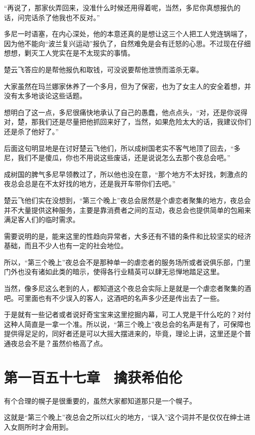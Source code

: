 “再说了，那家伙弄回来，没准什么时候还用得着呢，当然，多尼你真想报仇的话，问完话杀了他我也不反对。”

多尼一时语塞，在内心深处，他的本意还真的是想让这三个人把工人党连锅端了，因为他不能向“波兰复兴运动”报仇了，自然难免是会有迁怒的心思。不过现在仔细想想，剿灭工人党实在是不太现实的事情。

楚云飞答应的是帮他报仇和取钱，可没说要帮他泄愤而滥杀无辜。

大家虽然在玛兰娜家休养了一个多月，但为了保密，也为了女主人的安全着想，并没有太多地谈论这些话题。

想明白了这一点，多尼很痛快地承认了自己的愚蠢，他点点头，“对，还是你说得对，楚，那我们还是尽量把他抓回来好了，当然，如果危险太大的话，我建议你们还是杀了他好了。”

后面这句明显地是在讨好楚云飞他们，所以成树国老实不客气地顶了回去，“多尼，我们不是傻瓜，你也不用说这些废话，还是说说怎么去那个夜总会吧。”

成树国的脾气多尼早领教过了，所以他也没在意，“那个地方不太好找，刺激点的夜总会总是在不太好找的地方，还是我开车带你们去吧。”

楚云飞他们实在没想到，“第三个晚上”夜总会居然是个虐恋者聚集的地方，夜总会并不大量提供这种服务，主要是靠消费者之间的互动，夜总会也提供简单的包厢来满足客人们的临时需求。

需要说明的是，能来这里的性趋向异常者，大多还有不错的条件和比较坚实的经济基础，而且不少人也有一定的社会地位。

所以，“第三个晚上”夜总会不是那种单一的虐恋者的服务场所或者说俱乐部，门里门外也没有诸如此类的暗示，使得各行业精英可以肆无忌惮地踏足这里。

当然，像多尼这么老到的人，都知道这个夜总会实际上是就是一个虐恋者聚集的酒吧。可里面也有不少误入的客人，这酒吧的名声多少还是传出去了一些。

于是就有一些记者或者说好奇宝宝来这里挖掘内幕，可工人党是干什么吃的？对付这种人简直是一拿一个准。所以说，“第三个晚上”夜总会的名声是有了，可保障也提供得足足的，同好者还是可以大摇大摆进来的，毕竟，理论上讲，这里还是个普通夜总会不是？虽然价格高了点。

\section{第一百五十七章　擒获希伯伦}

有个合理的幌子是很重要的，虽然大家都知道那只是一个幌子。

这就是“第三个晚上”夜总会之所以红火的地方，“误入”这个词并不是仅仅在绅士进入女厕所时才会用到。

